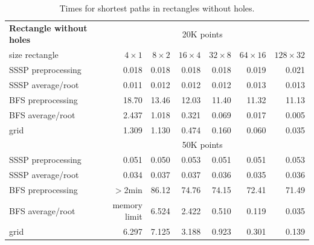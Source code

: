 \documentclass[a4paper,11pt]{article}
\begin{document}
\begin{table}[ht]
\begin{tabular}{l*{6}{r}}
\textbf{Rectangle without holes} & \multicolumn{6}{c}{20K points}\\						
size rectangle	&	$4\times 1$	&	$8\times 2$	&	$16\times 4$	&	$32\times 8$	&	$64\times 16$	&	$128\times 32$	\\
\hline
SSSP preprocessing	&	0.018	&	0.018	&	0.018	&	0.018	&	0.019	&	0.021	\\
SSSP average/root	&	0.011	&	0.012	&	0.012	&	0.012	&	0.013	&	0.013	\\
BFS preprocessing	&	18.70	&	13.46	&	12.03	&	11.40	&	11.32	&	11.13	\\
BFS average/root	&	2.437	&	1.018	&	0.321	&	0.069	&	0.017	&	0.005	\\
grid				&	1.309	&	1.130	&	0.474	&	0.160	&	0.060	&	0.035\vspace{.2cm}	\\
\hline
  & \multicolumn{6}{c}{50K points}\\						
\hline
SSSP preprocessing	&	0.051	&	0.050	&	0.053	&	0.051	&	0.051	&	0.053	\\
SSSP average/root	&	0.034	&	0.037	&	0.037	&	0.036	&	0.035	&	0.036	\\
BFS preprocessing	&	$>$2min	&	86.12	&	74.76	&	74.15	&	72.41	&	71.49	\\
BFS average/root	& \hspace{-.7cm}memory limit & 6.524	&	2.422	&	0.510	&	0.119	&	0.035	\\
grid				&	6.297	&	7.125	&	3.188	&	0.923	&	0.301	&	0.139
\end{tabular}
\caption{Times for shortest paths in rectangles without holes.}
\label{table1}
\end{table}
\end{document}

